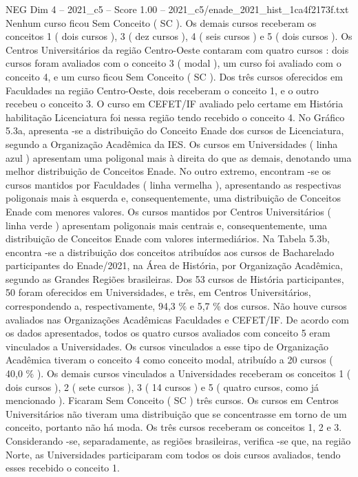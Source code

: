 \begin{textsample}{NEG Dim 4 – 2021\_c5 – Score 1.00 – 2021\_c5/enade\_2021\_hist\_1ca4f2173f.txt}
Nenhum curso ficou Sem Conceito ( SC ).
Os demais cursos receberam os conceitos 1 ( dois cursos ), 3 ( dez cursos ), 4 ( seis cursos ) e 5 ( dois cursos ).
Os Centros Universitários da região Centro-Oeste contaram com quatro cursos : dois cursos foram avaliados com o conceito 3 ( modal ), um curso foi avaliado com o conceito 4, e um curso ficou Sem Conceito ( SC ).
Dos três cursos oferecidos em Faculdades na região Centro-Oeste, dois receberam o conceito 1, e o outro recebeu o conceito 3.
O curso em CEFET/IF avaliado pelo certame em História habilitação Licenciatura foi nessa região tendo recebido o conceito 4.
No Gráfico 5.3a, apresenta -se a distribuição do Conceito Enade dos cursos de Licenciatura, segundo a Organização Acadêmica da IES.
Os cursos em Universidades ( linha azul ) apresentam uma poligonal mais à direita do que as demais, denotando uma melhor distribuição de Conceitos Enade.
No outro extremo, encontram -se os cursos mantidos por Faculdades ( linha vermelha ), apresentando as respectivas poligonais mais à esquerda e, consequentemente, uma distribuição de Conceitos Enade com menores valores.
Os cursos mantidos por Centros Universitários ( linha verde ) apresentam poligonais mais centrais e, consequentemente, uma distribuição de Conceitos Enade com valores intermediários.
Na Tabela 5.3b, encontra -se a distribuição dos conceitos atribuídos aos cursos de Bacharelado participantes do Enade/2021, na Área de História, por Organização Acadêmica, segundo as Grandes Regiões brasileiras.
Dos 53 cursos de História participantes, 50 foram oferecidos em Universidades, e três, em Centros Universitários, correspondendo a, respectivamente, 94,3 \% e 5,7 \% dos cursos.
Não houve cursos avaliados nas Organizações Acadêmicas Faculdades e CEFET/IF.
De acordo com os dados apresentados, todos os quatro cursos avaliados com conceito 5 eram vinculados a Universidades.
Os cursos vinculados a esse tipo de Organização Acadêmica tiveram o conceito 4 como conceito modal, atribuído a 20 cursos ( 40,0 \% ).
Os demais cursos vinculados a Universidades receberam os conceitos 1 ( dois cursos ), 2 ( sete cursos ), 3 ( 14 cursos ) e 5 ( quatro cursos, como já mencionado ).
Ficaram Sem Conceito ( SC ) três cursos.
Os cursos em Centros Universitários não tiveram uma distribuição que se concentrasse em torno de um conceito, portanto não há moda.
Os três cursos receberam os conceitos 1, 2 e 3.
Considerando -se, separadamente, as regiões brasileiras, verifica -se que, na região Norte, as Universidades participaram com todos os dois cursos avaliados, tendo esses recebido o conceito 1.

\end{textsample}
